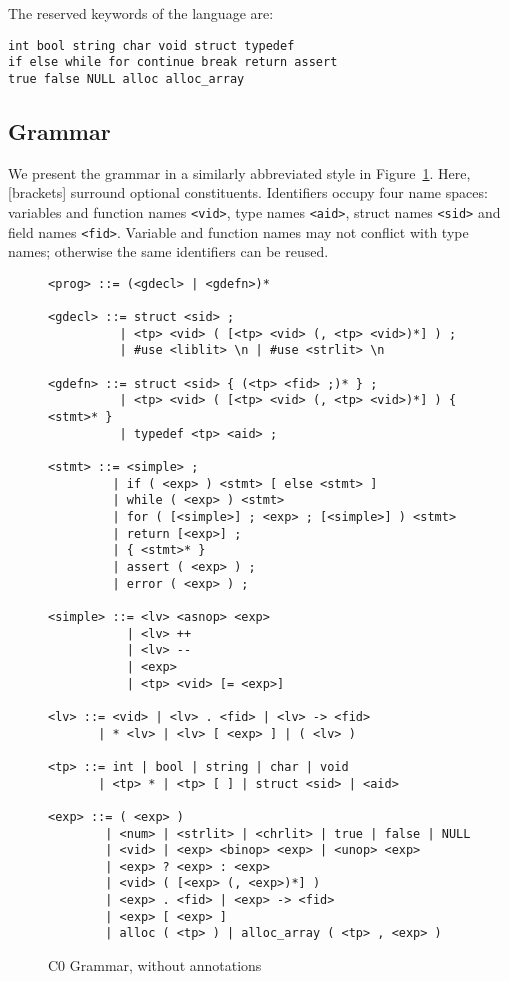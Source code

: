\documentclass[11pt]{article}
\begin{document}
The reserved keywords of the language are:
\begin{verbatim}
int bool string char void struct typedef
if else while for continue break return assert
true false NULL alloc alloc_array
\end{verbatim}

\subsection{Grammar}

We present the grammar in a similarly abbreviated style in
Figure~\ref{fig:grammar}.  Here, [brackets] surround optional
constituents.  Identifiers occupy four name spaces: variables and
function names \verb'<vid>', type names \verb'<aid>', struct names
\verb'<sid>' and field names \verb'<fid>'.  Variable and function
names may not conflict with type names; otherwise the same identifiers
can be reused.

\begin{figure}
\begin{small}
\begin{verbatim}
<prog> ::= (<gdecl> | <gdefn>)*

<gdecl> ::= struct <sid> ;
          | <tp> <vid> ( [<tp> <vid> (, <tp> <vid>)*] ) ;
          | #use <liblit> \n | #use <strlit> \n

<gdefn> ::= struct <sid> { (<tp> <fid> ;)* } ;
          | <tp> <vid> ( [<tp> <vid> (, <tp> <vid>)*] ) { <stmt>* }
          | typedef <tp> <aid> ;

<stmt> ::= <simple> ;
         | if ( <exp> ) <stmt> [ else <stmt> ]
         | while ( <exp> ) <stmt>
         | for ( [<simple>] ; <exp> ; [<simple>] ) <stmt>
         | return [<exp>] ;
         | { <stmt>* }
         | assert ( <exp> ) ;
         | error ( <exp> ) ; 

<simple> ::= <lv> <asnop> <exp>
           | <lv> ++
           | <lv> --
           | <exp>
           | <tp> <vid> [= <exp>]

<lv> ::= <vid> | <lv> . <fid> | <lv> -> <fid>
       | * <lv> | <lv> [ <exp> ] | ( <lv> )

<tp> ::= int | bool | string | char | void
       | <tp> * | <tp> [ ] | struct <sid> | <aid>

<exp> ::= ( <exp> )
        | <num> | <strlit> | <chrlit> | true | false | NULL
        | <vid> | <exp> <binop> <exp> | <unop> <exp>
        | <exp> ? <exp> : <exp>
        | <vid> ( [<exp> (, <exp>)*] )
        | <exp> . <fid> | <exp> -> <fid>
        | <exp> [ <exp> ]
        | alloc ( <tp> ) | alloc_array ( <tp> , <exp> )
\end{verbatim}
\end{small}
\caption{C0 Grammar, without annotations}
\label{fig:grammar}
\end{figure}
\end{document}
